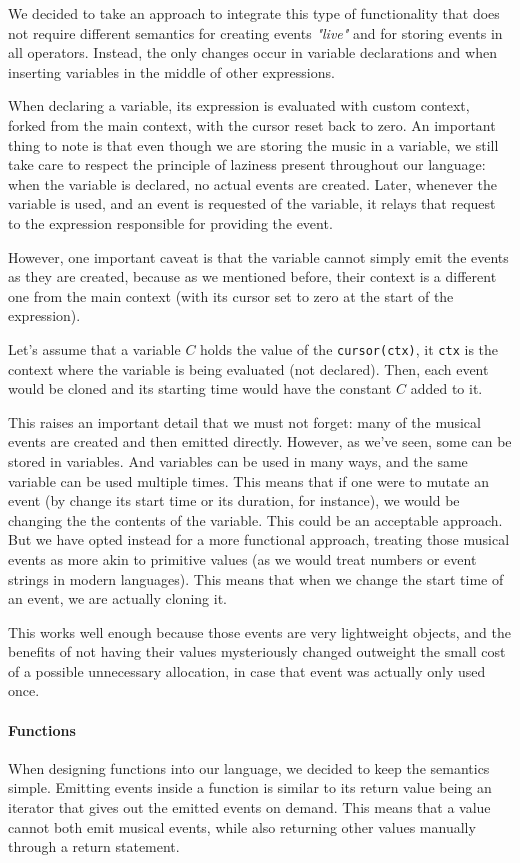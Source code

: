 \documentclass[a4paper,UKenglish,cleveref, autoref]{oasics-v2019}
\begin{document}
We decided to take an approach to integrate this type of functionality that does not require different semantics for creating events \textit{"live"} and for storing events in all operators. Instead, the only changes occur in variable declarations and when inserting variables in the middle of other expressions.

When declaring a variable, its expression is evaluated with custom context, forked from the main context, with the cursor reset back to zero. An important thing to note is that even though we are storing the music in a variable, we still take care to respect the principle of laziness present throughout our language: when the variable is declared, no actual events are created. Later, whenever the variable is used, and an event is requested of the variable, it relays that request to the expression responsible for providing the event.

However, one important caveat is that the variable cannot simply emit the events as they are created, because as we mentioned before, their context is a different one from the main context (with its cursor set to zero at the start of the expression).

Let's assume that a variable $C$ holds the value of the \texttt{cursor(ctx)}, it \texttt{ctx} is the context where the variable is being evaluated (not declared). Then, each event would be cloned and its starting time would have the constant $C$ added to it.

This raises an important detail that we must not forget: many of the musical events are created and then emitted directly. However, as we've seen, some can be stored in variables. And variables can be used in many ways, and the same variable can be used multiple times. This means that if one were to mutate an event (by change its start time or its duration, for instance), we would be changing the the contents of the variable. This could be an acceptable approach. But we have opted instead for a more functional approach, treating those musical events as more akin to primitive values (as we would treat numbers or event strings in modern languages). This means that when we change the start time of an event, we are actually cloning it.

This works well enough because those events are very lightweight objects, and the benefits of not having their values mysteriously changed outweight the small cost of a possible unnecessary allocation, in case that event was actually only used once.

\paragraph*{Functions}
When designing functions into our language, we decided to keep the semantics simple. Emitting events inside a function is similar to its return value being an iterator that gives out the emitted events on demand. This means that a value cannot both emit musical events, while also returning other values manually through a return statement.
\end{document}
